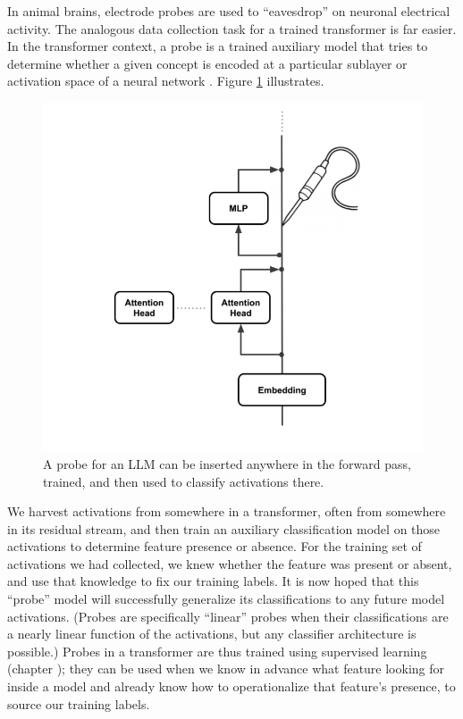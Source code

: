 In animal brains, electrode probes are used to ``eavesdrop'' on neuronal
electrical activity. The analogous data collection task for a trained
transformer is far easier. In the transformer context, a probe is a trained
auxiliary model that tries to determine whether a given concept is encoded at a
particular sublayer or activation space of a neural
network \cite{alain2018intermediate, belinkov2021classifiers}. Figure
\ref{linearProbe} illustrates.

\begin{figure}[ht]
\centering
\includegraphics[scale=.5]{./images/linearProbe.png}
\caption[Jeff Yoshimi; the line art for the probe was generated by ChatGPT.]{ A
      probe for an LLM can be inserted anywhere in the forward pass, trained,
      and then used to classify activations there.}
\label{linearProbe}
\end{figure}

We harvest activations from somewhere in a transformer, often from somewhere in
its residual stream, and then train an auxiliary classification model on those
activations to determine feature presence or absence. For the training set of
activations we had collected, we knew whether the feature was present or
absent, and use that knowledge to fix our training labels. It is now hoped that
this ``probe'' model will successfully generalize its classifications to any
future model activations. (Probes are specifically ``linear'' probes when their
classifications are a nearly linear function of the activations, but any
classifier architecture is possible.) Probes in a transformer are thus trained
using supervised learning (chapter ); they can be used
when we know in advance what feature looking for inside a model and already
know how to operationalize that feature's presence, to source our training
labels.

